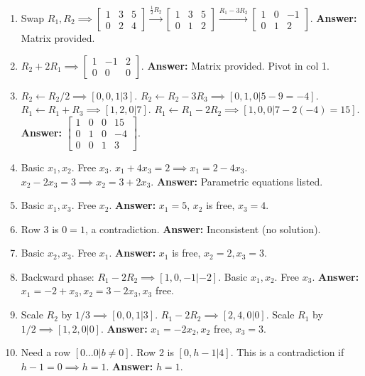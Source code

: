 \documentclass[11pt]{article}
\begin{document}
\begin{enumerate}[label=\textbf{Sol 1.2.\arabic*}]
    \item Swap $R_1, R_2 \implies \left[\begin{array}{ccc} 1 & 3 & 5 \\ 0 & 2 & 4 \end{array}\right] \xrightarrow{\frac{1}{2}R_2} \left[\begin{array}{ccc} 1 & 3 & 5 \\ 0 & 1 & 2 \end{array}\right] \xrightarrow{R_1-3R_2} \left[\begin{array}{ccc} 1 & 0 & -1 \\ 0 & 1 & 2 \end{array}\right]$. \textbf{Answer:} Matrix provided.
    \item $R_2+2R_1 \implies \left[\begin{array}{ccc} 1 & -1 & 2 \\ 0 & 0 & 0 \end{array}\right]$. \textbf{Answer:} Matrix provided. Pivot in col 1.
    \item $R_2 \gets R_2/2 \implies [0, 0, 1 | 3]$. $R_2 \gets R_2 - 3R_3 \implies [0, 1, 0 | 5 - 9 = -4]$. $R_1 \gets R_1 + R_3 \implies [1, 2, 0 | 7]$. $R_1 \gets R_1 - 2R_2 \implies [1, 0, 0 | 7 - 2(-4) = 15]$. \textbf{Answer:} $\left[\begin{array}{ccc|c} 1 & 0 & 0 & 15 \\ 0 & 1 & 0 & -4 \\ 0 & 0 & 1 & 3 \end{array}\right]$.
    \item Basic $x_1, x_2$. Free $x_3$. $x_1 + 4x_3 = 2 \implies x_1 = 2 - 4x_3$. $x_2 - 2x_3 = 3 \implies x_2 = 3 + 2x_3$. \textbf{Answer:} Parametric equations listed.
    \item Basic $x_1, x_3$. Free $x_2$. \textbf{Answer:} $x_1 = 5$, $x_2$ is free, $x_3 = 4$.
    \item Row 3 is $0=1$, a contradiction. \textbf{Answer:} Inconsistent (no solution).
    \item Basic $x_2, x_3$. Free $x_1$. \textbf{Answer:} $x_1$ is free, $x_2 = 2, x_3 = 3$.
    \item Backward phase: $R_1 - 2R_2 \implies [1, 0, -1 | -2]$. Basic $x_1, x_2$. Free $x_3$. \textbf{Answer:} $x_1 = -2 + x_3, x_2 = 3 - 2x_3, x_3$ free.
    \item Scale $R_2$ by $1/3 \implies [0,0,1|3]$. $R_1 - 2R_2 \implies [2, 4, 0 | 0]$. Scale $R_1$ by $1/2 \implies [1, 2, 0 | 0]$. \textbf{Answer:} $x_1 = -2x_2, x_2$ free, $x_3 = 3$.
    \item Need a row $[0 \dots 0 | b \neq 0]$. Row 2 is $[0, h-1 | 4]$. This is a contradiction if $h-1 = 0 \implies h = 1$. \textbf{Answer:} $h = 1$.

\end{enumerate}
\end{document}
